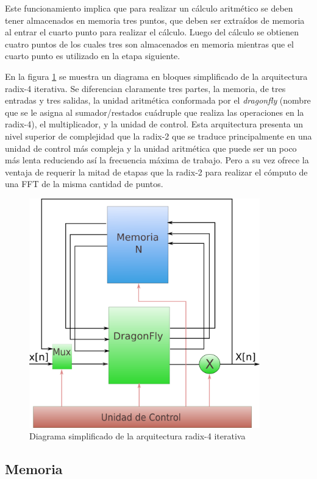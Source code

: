 Este funcionamiento implica que para realizar un cálculo aritmético se deben tener almacenados en
memoria tres puntos, que deben ser extraídos de memoria al entrar el cuarto punto para realizar el
cálculo. Luego del cálculo se obtienen cuatro puntos de los cuales tres son almacenados en memoria
mientras que el cuarto punto es utilizado en la etapa siguiente.


En la figura \ref{fig:radix4blocks} se muestra un diagrama en bloques simplificado de la
arquitectura radix-4 iterativa. Se diferencian claramente tres partes, la memoria, de tres entradas
y tres salidas, la unidad aritmética conformada por el \textit{dragonfly} (nombre que se le asigna
al sumador/restados cuádruple que realiza las operaciones en la radix-4), el multiplicador, y la
unidad de control. 
Esta arquitectura presenta un nivel superior de complejidad que la radix-2 que se traduce
principalmente en una unidad de control más compleja y la unidad aritmética que puede ser un poco
más lenta reduciendo así la frecuencia máxima de trabajo. Pero a su vez ofrece la ventaja de
requerir la mitad de etapas que la radix-2 para realizar el cómputo de una FFT de la misma cantidad 
de puntos.

\begin{figure}[htb!]
        \centering
        \includegraphics[width=10cm]{./figures/radix4blocks.png}
        \caption{Diagrama simplificado de la arquitectura radix-4 iterativa}
        \label{fig:radix4blocks}
\end{figure}

\subsection{Memoria} \label{sec:r4mem}

